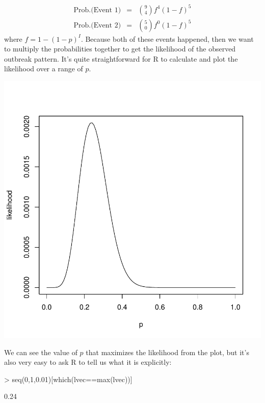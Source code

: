 \documentclass{article}
\begin{document}
\begin{eqnarray}
\text{Prob.(Event 1)}&=&{9 \choose 4}f^4 (1-f)^5 \\
\text{Prob.(Event 2)}&=&{5 \choose 0}f^0 (1-f)^5
\end{eqnarray}
%
where $f=1-(1-p)^I$. Because both of these events happened, then we want to multiply the probabilities together to get the likelihood of the observed outbreak pattern. It's quite straightforward for R to calculate and plot the likelihood over a range of $p$. 

\begin{Schunk}
\end{Schunk}
\includegraphics{chn_binom-006}

We can see the value of $p$ that maximizes the likelihood from the plot, but it's also very easy to ask R to tell us what it is explicitly:

\begin{Schunk}
\begin{Sinput}
> seq(0,1,0.01)[which(lvec==max(lvec))]
\end{Sinput}
\begin{Soutput}
[1] 0.24
\end{Soutput}
\end{Schunk}
\end{document}
